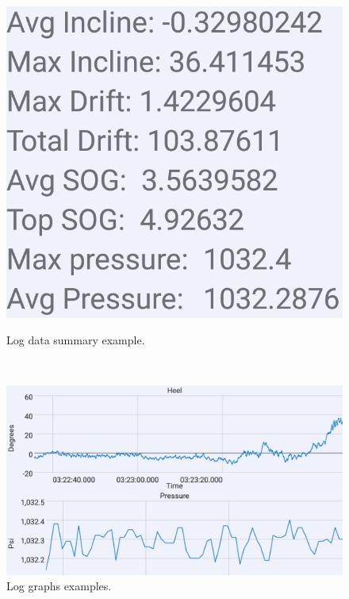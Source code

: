 \begin{figure}[H]
	\centering
	\begin{minipage}[t]{0.3\textwidth}
	\includegraphics[width=\textwidth]{Figures/log_data.png}
	\caption{Log data summary example.}
	\label{log-summary}
	\end{minipage}
	~
	\begin{minipage}[t]{0.6\textwidth}
	\includegraphics[width=\textwidth]{Figures/log_graph.png}
	\caption{Log graphs examples.}
	\label{log-graph}
	\end{minipage}
\end{figure}

